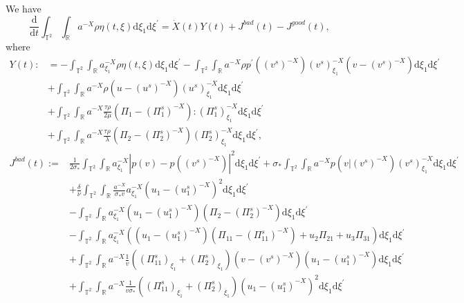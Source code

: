\documentclass[10pt,a4paper]{amsart}
\newcommand{\dif}{\mathrm{d}}
\begin{document}
\begin{lemma}\label{le4.5}
We have
\begin{equation}\label{4.5}
\frac{\dif}{\dif t}\int_{\mathbb{T}^2}\int_{\mathbb{R}}a^{-X}\rho\eta(t,\xi)\dif \xi_1\dif \xi^{\prime}=\dot{X}(t)Y(t)+J^{bad}(t)-J^{good}(t),
\end{equation}
where
\begin{align*}
Y(t):&=-\int_{\mathbb{T}^2}\int_{\mathbb{R}}a^{-X}_{\xi_1}\rho\eta(t,\xi)\dif \xi_1\dif \xi^{\prime}
-\int_{\mathbb{T}^2}\int_{\mathbb{R}}a^{-X}\rho p^{\prime}((v^s)^{-X})(v^s)^{-X}_{\xi_1}(v-(v^s)^{-X})\dif \xi_1\dif \xi^{\prime}\\
&+\int_{\mathbb{T}^2}\int_{\mathbb{R}}a^{-X}\rho \left(u-(u^s)^{-X}\right)(u^s)^{-X}_{\xi_1}\dif \xi_1\dif \xi^{\prime}\\
 &+\int_{\mathbb{T}^2}\int_{\mathbb{R}}a^{-X} \frac{\tau\rho}{2\mu}\left(\Pi_1-(\Pi_1^s)^{-X}\right):(\Pi_1^s)^{-X}_{\xi_1}\dif \xi_1\dif \xi^{\prime}\\
&+\int_{\mathbb{T}^2}\int_{\mathbb{R}}a^{-X} \frac{\tau\rho}{\lambda}\left(\Pi_2-(\Pi_2^s)^{-X}\right)(\Pi_2^s)^{-X}_{\xi_1}\dif \xi_1\dif \xi^{\prime},
\end{align*}
\begin{align*}
J^{bad}(t):=&\frac{1}{2\sigma_\ast}\int_{\mathbb{T}^2}\int_{\mathbb{R}}a^{-X}_{\xi_1}
|p(v)-p((v^s)^{-X})|^2\dif \xi_1\dif \xi^{\prime}
+\sigma_\ast\int_{\mathbb{T}^2}\int_{\mathbb{R}}a^{-X}p(v|(v^s)^{-X})(v^s)^{-X}_{\xi_1}\dif \xi_1\dif \xi^{\prime}\\
&+\frac{\delta}{\nu}\int_{\mathbb{T}^2}\int_{\mathbb{R}}\frac{a^{-X}}{\sigma_\ast v}a^{-X}_{\xi_1}\left(u_1-(u_1^s)^{-X}\right)^2\dif \xi_1\dif \xi^{\prime}\\
&-\int_{\mathbb{T}^2}\int_{\mathbb{R}}a^{-X}_{\xi_1}\left(u_1-(u_1^s)^{-X}\right)\left(\Pi_2-(\Pi_2^s)^{-X}\right)\dif \xi_1\dif \xi^{\prime}\\
&-\int_{\mathbb{T}^2}\int_{\mathbb{R}}a^{-X}_{\xi_1}\left(\left(u_1-(u^s_1)^{-X}\right)
\left(\Pi_{11}-(\Pi_{11}^s)^{-X}\right)+u_2\Pi_{21}+u_3\Pi_{31}
\right)\dif \xi_1\dif \xi^{\prime}\\
&+\int_{\mathbb{T}^2}\int_{\mathbb{R}}
a^{-X}\frac{1}{v}\left((\Pi_{11}^s)_{\xi_1}+(\Pi_{2}^s)_{\xi_1}\right)(v-(v^s)^{-X})\left(u_1-(u_1^s)^{-X}\right)
\dif \xi_1\dif \xi^{\prime}\\
&+\int_{\mathbb{T}^2}\int_{\mathbb{R}}a^{-X}\frac{1}{v\sigma_\ast}
\left((\Pi_{11}^s)_{\xi_1}+(\Pi_{2}^s)_{\xi_1}\right)\left(u_1-(u_1^s)^{-X}\right)^2
\dif \xi_1\dif \xi^{\prime}
\\

\end{align*}
\end{lemma}
\end{document}

